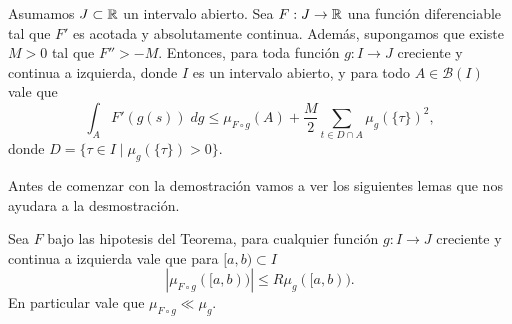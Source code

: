  \begin{thm}\label{TCV}
	Asumamos $J\subset\mathbb{R}$ un intervalo abierto. Sea $F:J\to \mathbb{R}$ una función diferenciable tal que $F'$ es acotada y absolutamente continua. Además,  supongamos que existe $M>0$ tal que $F''>-M$. Entonces, para toda función $g:I\to J$ creciente y  continua a izquierda,  donde $I$ es un intervalo abierto, y para todo $A\in \mathcal{B}(I)$ vale que
	$$\int_{A}F'(g(s)) \; dg\leq \mu_{F\circ g}(A)+\dfrac{M}{2}\sum_{t\in D\cap A}\mu_{g}(\{\tau\})^2,$$
donde $D=\{\tau\in I \mid \mu_{g}(\{\tau\})>0\}$.\label{Teorema medidas}
\end{thm}
Antes de comenzar con la demostración vamos a ver los siguientes lemas que nos ayudara a la desmostración.
\begin{lem}
Sea $F$ bajo las hipotesis del Teorema, para cualquier función $g:I\to J$ creciente y continua a izquierda vale que para $[a,b)\subset I$ \begin{equation}
    |\mu_{F\circ g}([a,b))|\leq R\mu_{g}([a,b)).
\end{equation}
En particular vale que $\mu_{F\circ g}\ll \mu_g$.\label{lem: abs cont}
\end{lem}
